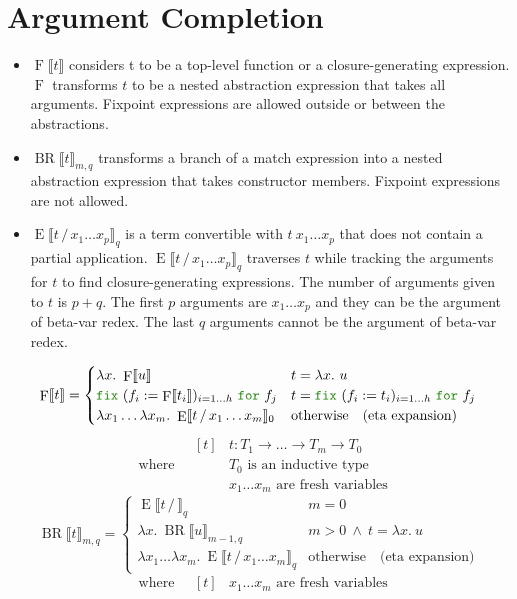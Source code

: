 \documentclass[a4paper,fleqn]{article}
\newcommand{\kwfix}{\mbox{\color{mygreen}\ttfamily fix}}
\newcommand{\kwfor}{\mbox{\color{mygreen}\ttfamily for}}
\newcommand{\lam}[2]{\lambda #1.~#2}
\newcommand{\lamB}[1]{\lambda #1.~}
\newcommand{\fix}[4]{\kwfix~(#1 := #2)_{#3}~\kwfor~#4}
\newcommand{\BRA}[1]{\llbracket #1 \rrbracket}
\DeclareMathOperator{\Fop}{F}
\newcommand{\F}[1]{\Fop\BRA{#1}}
\DeclareMathOperator{\BRop}{BR}
\newcommand{\BR}[3]{\BRop\BRA{#1}_{#2,#3}}
\DeclareMathOperator{\Eop}{E}
\newcommand{\E}[3]{\Eop\BRA{#1\,/\,#2}_{#3}}
\begin{document}
\section{Argument Completion}\label{sec:argcomp}
\raggedright
\begin{itemize}
  \item $\F{t}$ considers t to be a top-level function or a closure-generating expression.  $\Fop$ transforms $t$ to be a nested abstraction expression that takes all arguments.
    Fixpoint expressions are allowed outside or between the abstractions.
  \item $\BR{t}{m}{q}$ transforms a branch of a match expression into a nested abstraction expression that takes constructor members.
    Fixpoint expressions are not allowed.
  \item $\E{t}{x_1\dots x_p}{q}$ is a term convertible with $t~x_1\dots x_p$ that does not contain a partial application.
    $\E{t}{x_1\dots x_p}{q}$ traverses $t$ while tracking the arguments for $t$ to find closure-generating expressions.
    The number of arguments given to $t$ is $p+q$.
    The first $p$ arguments are $x_1\dots x_p$ and they can be the argument of beta-var redex.
    The last $q$ arguments cannot be the argument of beta-var redex.
\end{itemize}
\[
  \F{t} =
  \begin{cases}
    \lam{x}{\F{u}} & t = \lam{x}{u} \\
    \fix{f_i}{\F{t_i}}{i=1\dots h}{f_j}  & t = \fix{f_i}{t_i}{i=1\dots h}{f_j} \\
    \lambda x_1\dots\lamB{x_m}\E{t}{x_1\dots x_m}{0}        & \text{otherwise} \quad \text{(eta expansion)}
  \end{cases}
\]
\[ \quad\text{where} \quad
  \begin{aligned}[t]
    & t : T_1 \rightarrow \dots \rightarrow T_m \rightarrow T_0 \\
    & \text{$T_0$ is an inductive type} \\
    & \text{$x_1\dots x_m$ are fresh variables}
  \end{aligned}
\]
\[
  \BR{t}{m}{q} =
  \begin{cases}
    \E{t}{}{q}    & m = 0 \\
    \lam{x}{\BR{u}{m-1}{q}} & m > 0 ~\wedge~ t = \lam{x}{u} \\
    \lambda x_1\dots\lamB{x_m}\E{t}{x_1\dots x_m}{q}        & \text{otherwise} \quad \text{(eta expansion)}
  \end{cases}
\]
\[ \quad\text{where} \quad
  \begin{aligned}[t]
    & \text{$x_1\dots x_m$ are fresh variables}
  \end{aligned}
\]
\end{document}
